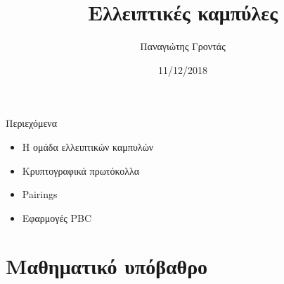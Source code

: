 \documentclass[handout]{beamer}
\title{Ελλειπτικές καμπύλες}
\author{Παναγιώτης Γροντάς}
\date{11/12/2018}
\institute{ΕΜΠ - Κρυπτογραφία (2018-2019)}
\begin{document}
\newcommand{\xor}{ \oplus }
\newcommand{\msg}{ \mathtt{M} }
\newcommand{\KEY}{ \mathtt{K} }
\newcommand{\CPH}{ \mathtt{C} }
\newcommand{\keygen}{\mathtt{KeyGen}}
\newcommand{\enc}{\mathtt{Enc}}
\newcommand{\dec}{\mathtt{Dec}}
\newcommand{\sign}{\mathtt{Sign}}
\newcommand{\ver}{$\mathcal{V} \ $}
\newcommand{\prv}{$\mathcal{P} \ $}
\newcommand{\verify}{\mathtt{Verify}}
\newcommand{\adv}{$\mathcal{A}$ }
\newcommand{\Hash}{\mathcal{H} }
\newcommand{\advb}{$\mathcal{B}$ }
\newcommand{\chal}{$\mathcal{C}$ }
\newcommand{\cs}{$\mathcal{CS}$}
\newcommand{\Zed}{\mathbb{Z}} 
\newcommand{\zns}{\mathbb{Z}^*_n}
\newcommand{\zs}[1]{\mathbb{Z}^*_{#1}}

\newcommand{\green}[1]{\textcolor{teal}{#1}}
\newcommand{\Green}[1]{\textcolor{Teal}{#1}}
\newcommand{\ForestGreen}[1]{\textcolor{ForestGreen}{#1}}
\newcommand{\blue}[1]{\textcolor{blue}{#1}}
\newcommand{\magenta}[1]{\textcolor{magenta}{#1}}
\newcommand{\cyan}[1]{\textcolor{cyan}{#1}}

\newcommand{\twopartdef}[4]
{ 
		\begin{cases}
			#1 , #2 \\
			#3 , #4
		\end{cases} 
}

\begin{frame}
	\titlepage
\end{frame}
	
\begin{frame}{Περιεχόμενα}
\begin{itemize}
\item Η ομάδα ελλειπτικών καμπυλών
\item Κρυπτογραφικά πρωτόκολλα
\item Pairings
\item Εφαρμογές PBC
\end{itemize}
\end{frame}

\section{Μαθηματικό υπόβαθρο}
\end{document}
